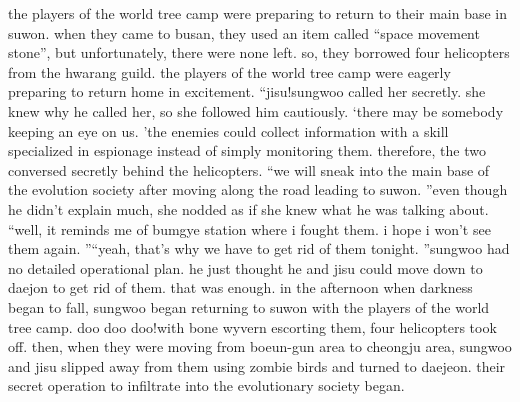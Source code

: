 the players of the world tree camp were preparing to return to their main base in suwon.
when they came to busan, they used an item called “space movement stone”, but unfortunately, there were none left.
 so, they borrowed four helicopters from the hwarang guild.
the players of the world tree camp were eagerly preparing to return home in excitement.
“jisu!sungwoo called her secretly.
 she knew why he called her, so she followed him cautiously.
‘there may be somebody keeping an eye on us.
’the enemies could collect information with a skill specialized in espionage instead of simply monitoring them.
 therefore, the two conversed secretly behind the helicopters.
“we will sneak into the main base of the evolution society after moving along the road leading to suwon.
”even though he didn’t explain much, she nodded as if she knew what he was talking about.
“well, it reminds me of bumgye station where i fought them.
 i hope i won’t see them again.
”“yeah, that’s why we have to get rid of them tonight.
”sungwoo had no detailed operational plan.
 he just thought he and jisu could move down to daejon to get rid of them.
 that was enough.
in the afternoon when darkness began to fall, sungwoo began returning to suwon with the players of the world tree camp.
doo doo doo!with bone wyvern escorting them, four helicopters took off.
then, when they were moving from boeun-gun area to cheongju area, sungwoo and jisu slipped away from them using zombie birds and turned to daejeon.
their secret operation to infiltrate into the evolutionary society began.


 